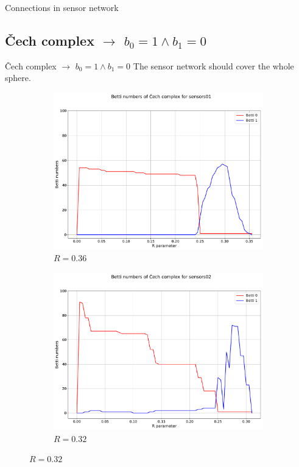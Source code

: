 \documentclass{beamer}
\begin{document}
\begin{frame}{Connections in sensor network}
\begin{figure}[!ht]
\end{figure}
\end{frame}










\subsection{Čech complex $\longrightarrow$ $b_0 = 1 \wedge b_1 = 0$}

\begin{frame}{Čech complex $\longrightarrow$ $b_0 = 1 \wedge b_1 = 0$}
The sensor network should cover the whole sphere.
\begin{figure}[!ht]
	\centering
	\begin{subfigure}{.5\textwidth}
		\centering
		\includegraphics[scale=0.19]{used_images/plot_cech_sensors01.pdf}
		\caption{$R = 0.36$}
	\end{subfigure}%
	\begin{subfigure}{.5\textwidth}
		\centering
		\includegraphics[scale=0.19]{used_images/plot_cech_sensors02.pdf}
		\caption{$R = 0.32$}
	\end{subfigure}%
	
\end{figure}
\end{frame}
\end{document}
